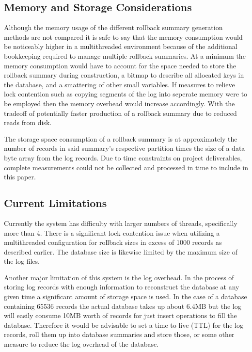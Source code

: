 \documentclass{article}
\begin{document}
\subsection{Memory and Storage Considerations}

Although the memory usage of the different rollback summary generation methods are not compared it is safe to say that the memory consumption would be noticeably higher in a multithreaded environment because of the additional bookkeeping required to manage multiple rollback summaries. At a minimum the memory consumption would have to account for the space needed to store the rollback summary during construction, a bitmap to describe all allocated keys in the database, and a smattering of other small variables. If measures to relieve lock contention such as copying segments of the log into seperate memory were to be employed then the memory overhead would increase accordingly. With the tradeoff of potentially faster production of a rollback summary due to reduced reads from disk.

The storage space consumption of a rollback summary is at approximately the number of records in said summary's respective partition times the size of a data byte array from the log records. Due to time constraints on project deliverables, complete measurements could not be collected and processed in time to include in this paper.

\subsection{Current Limitations}
Currently the system has difficulty with larger numbers of threads, specifically more than 4. There is a significant lock contention issue when utilizing a multithreaded configuration for rollback sizes in excess of 1000 records as described earlier. The database size is likewise limited by the maximum size of the log files.

Another major limitation of this system is the log overhead. In the process of storing log records with enough information to reconstruct the database at any given time a significant amount of storage space is used. In the case of a database containing 65536 records the actual database takes up about 6.4MB but the log will easily consume 10MB worth of records for just insert operations to fill the database. Therefore it would be advisable to set a time to live (TTL) for the log records, roll them up into database summaries and store those, or some other measure to reduce the log overhead of the database.
\end{document}
